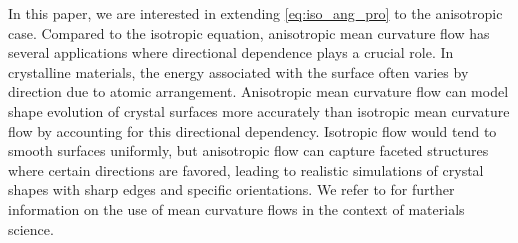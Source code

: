 \documentclass[12pt]{article}
\numberwithin{equation}{section}
\theoremstyle{plain}
\theoremstyle{definition}
\theoremstyle{remark}
\begin{document}
In this paper, we are interested in extending \eqref{eq:iso_ang_pro} to the anisotropic case. Compared to the isotropic equation, anisotropic mean curvature flow has several applications where directional dependence plays a crucial role. In crystalline materials, the energy associated with the surface often varies by direction due to atomic arrangement. Anisotropic mean curvature flow can model shape evolution of crystal surfaces more accurately than isotropic mean curvature flow by accounting for this directional dependency. Isotropic flow would tend to smooth surfaces uniformly, but anisotropic flow can capture faceted structures where certain directions are favored, leading to realistic simulations of crystal shapes with sharp edges and specific orientations.  We refer to \cite{taylor1, Ta} for further information on 
the use of mean curvature flows in the context of materials science.
\end{document}
